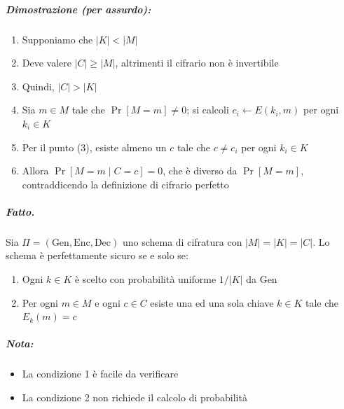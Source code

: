 \documentclass{article}
\begin{document}
\subparagraph{Dimostrazione (per assurdo):}
\begin{enumerate}
    \item Supponiamo che $|K| < |M|$
    \item Deve valere $|C| \geq |M|$, altrimenti il cifrario non è invertibile
    \item Quindi, $|C| > |K|$
    \item Sia $m \in M$ tale che $\Pr[M = m] \neq 0$; si calcoli $c_i \leftarrow E(k_i, m)$ per ogni $k_i \in K$
    \item Per il punto (3), esiste almeno un $c$ tale che $c \neq c_i$ per ogni $k_i \in K$
    \item Allora $\Pr[M = m \mid C = c] = 0$, che è diverso da $\Pr[M = m]$, contraddicendo la definizione di cifrario perfetto
\end{enumerate}

\subparagraph{Fatto.} Sia $\Pi = (\text{Gen}, \text{Enc}, \text{Dec})$ uno schema di cifratura con $|M| = |K| = |C|$. Lo schema è perfettamente sicuro se e solo se:
\begin{enumerate}
    \item Ogni $k \in K$ è scelto con probabilità uniforme $1/|K|$ da Gen
    \item Per ogni $m \in M$ e ogni $c \in C$ esiste una ed una sola chiave $k \in K$ tale che $E_k(m) = c$
\end{enumerate}

\subparagraph{Nota:}
\begin{itemize}
    \item La condizione 1 è facile da verificare
    \item La condizione 2 non richiede il calcolo di probabilità
\end{itemize}

            
 
       
        
    
\end{document}
